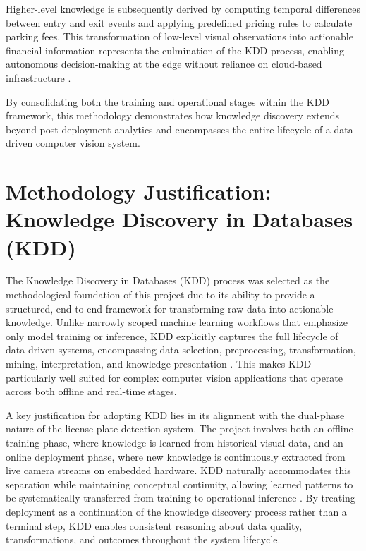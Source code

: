 Higher-level knowledge is subsequently derived by computing temporal differences between entry and exit events and applying predefined pricing rules to calculate parking fees. This transformation of low-level visual observations into actionable financial information represents the culmination of the KDD process, enabling autonomous decision-making at the edge without reliance on cloud-based infrastructure \cite{shi2016edge}.

\noindent
By consolidating both the training and operational stages within the KDD framework, this methodology demonstrates how knowledge discovery extends beyond post-deployment analytics and encompasses the entire lifecycle of a data-driven computer vision system.


\section{Methodology Justification: Knowledge Discovery in Databases (KDD)}

\noindent
The Knowledge Discovery in Databases (KDD) process was selected as the methodological foundation of this project due to its ability to provide a structured, end-to-end framework for transforming raw data into actionable knowledge. Unlike narrowly scoped machine learning workflows that emphasize only model training or inference, KDD explicitly captures the full lifecycle of data-driven systems, encompassing data selection, preprocessing, transformation, mining, interpretation, and knowledge presentation \cite{fayyad1996knowledge,han2011data}. This makes KDD particularly well suited for complex computer vision applications that operate across both offline and real-time stages.\newline

\noindent
A key justification for adopting KDD lies in its alignment with the dual-phase nature of the license plate detection system. The project involves both an offline training phase, where knowledge is learned from historical visual data, and an online deployment phase, where new knowledge is continuously extracted from live camera streams on embedded hardware. KDD naturally accommodates this separation while maintaining conceptual continuity, allowing learned patterns to be systematically transferred from training to operational inference \cite{shearer2000crisp}. By treating deployment as a continuation of the knowledge discovery process rather than a terminal step, KDD enables consistent reasoning about data quality, transformations, and outcomes throughout the system lifecycle.\newline

